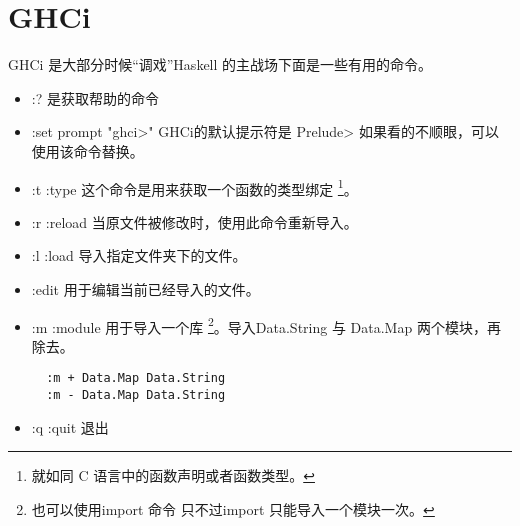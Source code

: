 \section{GHCi}
GHCi 是大部分时候“调戏”Haskell 的主战场下面是一些有用的命令。
\begin{itemize}
	\item :? 是获取帮助的命令
	\item :set prompt "ghci>" GHCi的默认提示符是 Prelude> 如果看的不顺眼，可以使用该命令替换。
	\item :t :type 这个命令是用来获取一个函数的类型绑定 \footnote{就如同 C 语言中的函数声明或者函数类型。}。
	\item :r :reload 当原文件被修改时，使用此命令重新导入。
	\item :l :load 导入指定文件夹下的文件。
	\item :edit 用于编辑当前已经导入的文件。
	\item :m :module 用于导入一个库 \footnote{也可以使用import 命令 只不过import 只能导入一个模块一次。}。导入Data.String 与 Data.Map 两个模块，再除去。
\begin{lstlisting}
  :m + Data.Map Data.String
  :m - Data.Map Data.String
\end{lstlisting}
	\item :q :quit 退出
\end{itemize}

\documentEnd
\endinput 